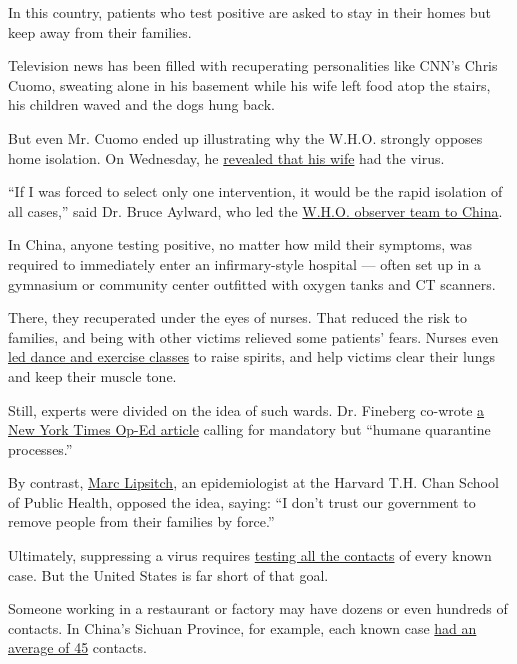 In this country, patients who test positive are asked to stay in their
homes but keep away from their families.

Television news has been filled with recuperating personalities like
CNN's Chris Cuomo, sweating alone in his basement while his wife left
food atop the stairs, his children waved and the dogs hung back.

But even Mr. Cuomo ended up illustrating why the W.H.O. strongly opposes
home isolation. On Wednesday, he
\href{https://www.cnn.com/2020/04/15/us/chris-cuomo-wife-coronavirus/index.html}{revealed
that his wife} had the virus.

``If I was forced to select only one intervention, it would be the rapid
isolation of all cases,'' said Dr. Bruce Aylward, who led the
\href{https://www.who.int/docs/default-source/coronaviruse/who-china-joint-mission-on-covid-19-final-report.pdf}{W.H.O.
observer team to China}.

In China, anyone testing positive, no matter how mild their symptoms,
was required to immediately enter an infirmary-style hospital --- often
set up in a gymnasium or community center outfitted with oxygen tanks
and CT scanners.

There, they recuperated under the eyes of nurses. That reduced the risk
to families, and being with other victims relieved some patients' fears.
Nurses even \href{https://www.youtube.com/watch?v=M7fqUHdoOyc}{led dance
and exercise classes} to raise spirits, and help victims clear their
lungs and keep their muscle tone.

Still, experts were divided on the idea of such wards. Dr. Fineberg
co-wrote
\href{https://www.nytimes.com/2020/04/07/opinion/coronavirus-smart-quarantine.html}{a
New York Times Op-Ed article} calling for mandatory but ``humane
quarantine processes.''

By contrast, \href{https://www.hsph.harvard.edu/marc-lipsitch/}{Marc
Lipsitch}, an epidemiologist at the Harvard T.H. Chan School of Public
Health, opposed the idea, saying: ``I don't trust our government to
remove people from their families by force.''

Ultimately, suppressing a virus requires
\href{https://www.centerforhealthsecurity.org/our-work/pubs_archive/pubs-pdfs/2020/a-national-plan-to-enable-comprehensive-COVID-19-case-finding-and-contact-tracing-in-the-US.pdf}{testing
all the contacts} of every known case. But the United States is far
short of that goal.

Someone working in a restaurant or factory may have dozens or even
hundreds of contacts. In China's Sichuan Province, for example, each
known case
\href{https://www.who.int/docs/default-source/coronaviruse/who-china-joint-mission-on-covid-19-final-report.pdf}{had
an average of 45} contacts.

